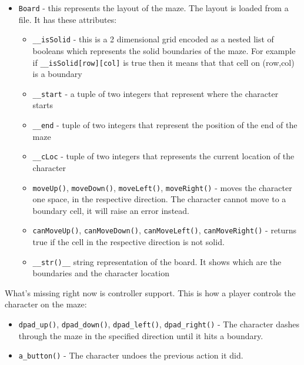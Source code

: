 \begin{itemize}
\tightlist
\item
  \texttt{Board} - this represents the layout of the maze. The layout is
  loaded from a file. It has these attributes:

  \begin{itemize}
  \tightlist
  \item
    \texttt{\_\_isSolid} - this is a 2 dimensional grid encoded as a
    nested list of booleans which represents the solid boundaries of the
    maze. For example if \texttt{\_\_isSolid{[}row{]}{[}col{]}} is true
    then it means that that cell on (row,col) is a boundary
  \item
    \texttt{\_\_start} - a tuple of two integers that represent where
    the character starts
  \item
    \texttt{\_\_end} - tuple of two integers that represent the position
    of the end of the maze
  \item
    \texttt{\_\_cLoc} - tuple of two integers that represents the
    current location of the character
  \item
    \texttt{moveUp()}, \texttt{moveDown()}, \texttt{moveLeft()},
    \texttt{moveRight()} - moves the character one space, in the
    respective direction. The character cannot move to a boundary cell,
    it will raise an error instead.
  \item
    \texttt{canMoveUp()}, \texttt{canMoveDown()},
    \texttt{canMoveLeft()}, \texttt{canMoveRight()} - returns true if
    the cell in the respective direction is not solid.
  \item
    \texttt{\_\_str()\_\_} string representation of the board. It shows
    which are the boundaries and the character location
  \end{itemize}
\end{itemize}

What's missing right now is controller support. This is how a player
controls the character on the maze:

\begin{itemize}
\tightlist
\item
  \texttt{dpad\_up()}, \texttt{dpad\_down()}, \texttt{dpad\_left()},
  \texttt{dpad\_right()} - The character dashes through the maze in the
  specified direction until it hits a boundary.
\item
  \texttt{a\_button()} - The character undoes the previous action it
  did.
\end{itemize}

